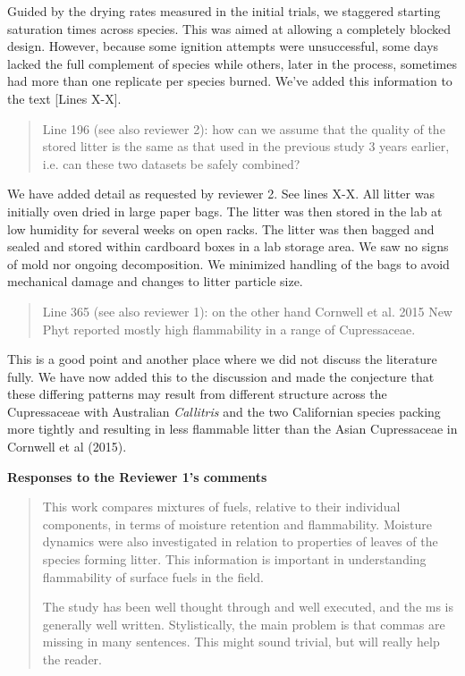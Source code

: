 \documentclass[letterpaper, 12pt]{letter}
\begin{document}
\begin{letter}{}
Guided by the drying rates measured in the initial trials, we staggered starting saturation times across species. This was aimed at allowing a completely blocked design. However, because some ignition attempts were unsuccessful, some days lacked the full complement of species while others, later in the process, sometimes had more than one replicate per species burned. We've added this information to the text [Lines X-X].

\begin{quote}
Line 196 (see also reviewer 2): how can we assume that the quality of the stored litter is the same as that used in the previous study 3 years earlier, i.e. can these two datasets be safely combined?
\end{quote}

We have added detail as requested by reviewer 2. See lines X-X. All litter was
initially oven dried in large paper bags. The litter was then stored in the lab
at low humidity for several weeks on open racks. The litter was then bagged and
sealed and stored within cardboard boxes in a lab storage area. We saw no signs
of mold nor ongoing decomposition. We minimized handling of the bags to avoid
mechanical damage and changes to litter particle size.


\begin{quote}
Line 365 (see also reviewer 1): on the other hand Cornwell et al. 2015 New Phyt reported mostly high flammability in a range of Cupressaceae.
\end{quote}

This is a good point and another place where we did not discuss the literature fully. We
have now added this to the discussion and made the conjecture that these
differing patterns may result from different structure across the
Cupressaceae with Australian \emph{Callitris} and the two Californian species
packing more tightly and resulting in less flammable litter than the Asian
Cupressaceae in Cornwell et al (2015).


{\bf Responses to the Reviewer 1's comments}

\begin{quote}
This work compares mixtures of fuels, relative to their individual components, in terms of moisture retention and flammability. Moisture dynamics were also investigated in relation to properties of leaves of the species forming litter. This information is important in understanding flammability of surface fuels in the field. 

The study has been well thought through and well executed, and the ms is generally well written. Stylistically, the main problem is that commas are missing in many sentences. This might sound trivial, but will really help the reader.
\end{quote}


\end{letter}
\end{document}
